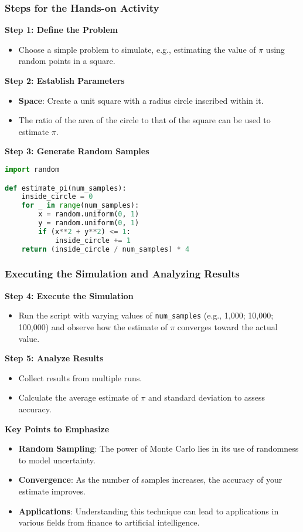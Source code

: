 \documentclass[aspectratio=169]{beamer}
\begin{document}
\begin{frame}[fragile]
    \frametitle{Steps for the Hands-on Activity}
    
    \textbf{Step 1: Define the Problem}
    \begin{itemize}
        \item Choose a simple problem to simulate, e.g., estimating the value of $\pi$ using random points in a square.
    \end{itemize}

    \textbf{Step 2: Establish Parameters}
    \begin{itemize}
        \item \textbf{Space}: Create a unit square with a radius circle inscribed within it.
        \item The ratio of the area of the circle to that of the square can be used to estimate $\pi$.
    \end{itemize}

    \textbf{Step 3: Generate Random Samples}
    \begin{lstlisting}[language=Python]
import random

def estimate_pi(num_samples):
    inside_circle = 0
    for _ in range(num_samples):
        x = random.uniform(0, 1)
        y = random.uniform(0, 1)
        if (x**2 + y**2) <= 1:
            inside_circle += 1
    return (inside_circle / num_samples) * 4
    \end{lstlisting}
\end{frame}

\begin{frame}[fragile]
    \frametitle{Executing the Simulation and Analyzing Results}

    \textbf{Step 4: Execute the Simulation}
    \begin{itemize}
        \item Run the script with varying values of \texttt{num\_samples} (e.g., 1,000; 10,000; 100,000) and observe how the estimate of $\pi$ converges toward the actual value.
    \end{itemize}

    \textbf{Step 5: Analyze Results}
    \begin{itemize}
        \item Collect results from multiple runs.
        \item Calculate the average estimate of $\pi$ and standard deviation to assess accuracy.
    \end{itemize}

    \textbf{Key Points to Emphasize}
    \begin{itemize}
        \item \textbf{Random Sampling}: The power of Monte Carlo lies in its use of randomness to model uncertainty.
        \item \textbf{Convergence}: As the number of samples increases, the accuracy of your estimate improves.
        \item \textbf{Applications}: Understanding this technique can lead to applications in various fields from finance to artificial intelligence.
    \end{itemize}
\end{frame}
\end{document}
